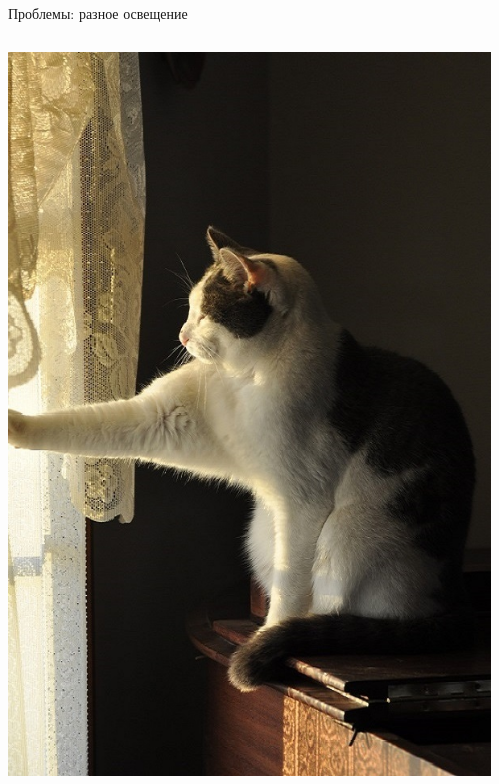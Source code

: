 \documentclass[aspectratio=169, professionalfonts]{beamer}
\begin{document}
\begin{frame}{Проблемы: разное освещение}
    \begin{columns}
        \begin{column}{.325\linewidth}
            \centering
            \includegraphics[width=\linewidth]{graphs/fig12_1.jpg}
        \end{column}
        \begin{column}{.325\linewidth}
            \centering

\end{column}
\end{columns}
\end{frame}
\end{document}
